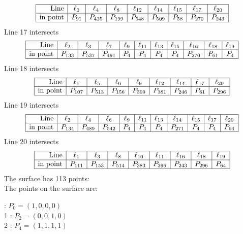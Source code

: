 \documentclass{article}
\begin{document}
{$$\begin{array}{|r*{8}{|c}|}
\hline
\mbox{Line}  & \ell_{0} & \ell_{4} & \ell_{8} & \ell_{12} & \ell_{14} & \ell_{15} & \ell_{17} & \ell_{20}\\
\hline
\mbox{in point}  & P_{91} & P_{425} & P_{199} & P_{548} & P_{509} & P_{58} & P_{270} & P_{243}\\
\hline
\end{array}
$$
Line 17 intersects 
$$
\begin{array}{|r*{10}{|c}|}
\hline
\mbox{Line}  & \ell_{2} & \ell_{3} & \ell_{7} & \ell_{9} & \ell_{11} & \ell_{13} & \ell_{15} & \ell_{16} & \ell_{18} & \ell_{19}\\
\hline
\mbox{in point}  & P_{133} & P_{537} & P_{491} & P_{4} & P_{4} & P_{4} & P_{4} & P_{270} & P_{61} & P_{4}\\
\hline
\end{array}
$$
Line 18 intersects 
$$
\begin{array}{|r*{8}{|c}|}
\hline
\mbox{Line}  & \ell_{1} & \ell_{5} & \ell_{6} & \ell_{9} & \ell_{12} & \ell_{14} & \ell_{17} & \ell_{20}\\
\hline
\mbox{in point}  & P_{107} & P_{513} & P_{156} & P_{399} & P_{381} & P_{246} & P_{61} & P_{296}\\
\hline
\end{array}
$$
Line 19 intersects 
$$
\begin{array}{|r*{10}{|c}|}
\hline
\mbox{Line}  & \ell_{2} & \ell_{4} & \ell_{6} & \ell_{9} & \ell_{11} & \ell_{13} & \ell_{14} & \ell_{15} & \ell_{17} & \ell_{20}\\
\hline
\mbox{in point}  & P_{134} & P_{489} & P_{542} & P_{4} & P_{4} & P_{4} & P_{271} & P_{4} & P_{4} & P_{64}\\
\hline
\end{array}
$$
Line 20 intersects 
$$
\begin{array}{|r*{8}{|c}|}
\hline
\mbox{Line}  & \ell_{1} & \ell_{3} & \ell_{8} & \ell_{10} & \ell_{11} & \ell_{16} & \ell_{18} & \ell_{19}\\
\hline
\mbox{in point}  & P_{111} & P_{153} & P_{514} & P_{383} & P_{396} & P_{243} & P_{296} & P_{64}\\
\hline
\end{array}
$$
The surface has 113 points:\\
The points on the surface are:\\
\begin{multicols}{3}
 : $P_{0}=( 1, 0, 0, 0 )$\\
1 : $P_{2}=( 0, 0, 1, 0 )$\\
2 : $P_{4}=( 1, 1, 1, 1 )$\\

\end{multicols}}
\end{document}
